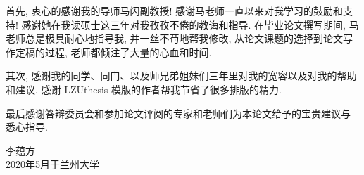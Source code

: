 \documentclass[oneside,longtitle]{LZUthesis}
\numberwithin{equation}{chapter}
\begin{document}
\appendix




\begin{thanks}
	首先, 衷心的感谢我的导师马闪副教授! 感谢马老师一直以来对我学习的鼓励和支持!
	感谢她在我读硕士这三年对我孜孜不倦的教诲和指导.
	在毕业论文撰写期间, 马老师总是极具耐心地指导我, 并一丝不苟地帮我修改,
	从论文课题的选择到论文写作定稿的过程, 老师都倾注了大量的心血和时间.

	其次, 感谢我的同学、同门、以及师兄弟姐妹们三年里对我的宽容以及对我的帮助和建议.
	感谢 LZUthesis 模版的作者帮我节省了很多排版的精力.

	最后感谢答辩委员会和参加论文评阅的专家和老师们为本论文给予的宝贵建议与
	悉心指导.
	\begin{flushright}
		李蕴方\\
		2020年5月于兰州大学
	\end{flushright}

\end{thanks}
\end{document}
